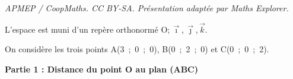 \documentclass[10pt]{article}
\providecommand{\Oijk}{\(\mathrm{O};\vec{\imath},\vec{\jmath},\vec{k}\)}
\begin{document}
\noindent\textit{APMEP / CoopMaths. CC BY-SA. Présentation adaptée par Maths Explorer.}\par\medskip
\medskip

L'espace est muni d'un repère orthonormé \Oijk.

On considère les trois points A(3~;~0~;~0), B(0~;~2~;~0) et C(0~;~0~;~2).





















\bigskip

\textbf{Partie 1 : Distance du point O au plan (ABC)}

\medskip
\end{document}
